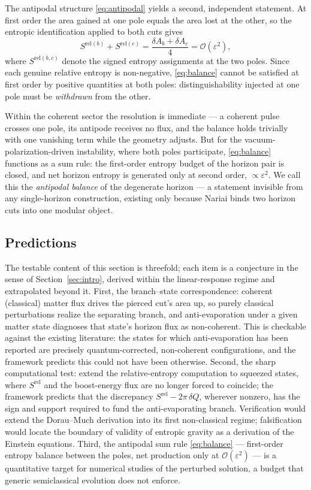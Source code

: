 \documentclass[11pt]{article}
\newcommand{\Srel}{S^{\mathrm{rel}}}
\newcommand{\Nariai}{Nariai}
\begin{document}
The antipodal structure \eqref{eq:antipodal} yields a second, independent statement. At first order the area gained at one pole equals the area lost at the other, so the entropic identification applied to both cuts gives
\begin{equation}
S^{\mathrm{rel}(b)} + S^{\mathrm{rel}(c)}
= \frac{\delta A_b + \delta A_c}{4}
= \mathcal{O}(\varepsilon^2),
\label{eq:balance}
\end{equation}
where $S^{\mathrm{rel}(b,c)}$ denote the signed entropy assignments at the two poles. Since each genuine relative entropy is non-negative, \eqref{eq:balance} cannot be satisfied at first order by positive quantities at both poles: distinguishability injected at one pole must be \emph{withdrawn} from the other.

Within the coherent sector the resolution is immediate --- a coherent pulse crosses one pole, its antipode receives no flux, and the balance holds trivially with one vanishing term while the geometry adjusts. But for the vacuum-polarization-driven instability, where both poles participate, \eqref{eq:balance} functions as a sum rule: the first-order entropy budget of the horizon pair is closed, and net horizon entropy is generated only at second order, $\propto \varepsilon^2$. We call this the \emph{antipodal balance} of the degenerate horizon --- a statement invisible from any single-horizon construction, existing only because \Nariai{} binds two horizon cuts into one modular object.

\subsection{Predictions}

The testable content of this section is threefold; each item is a conjecture in the sense of Section~\ref{sec:intro}, derived within the linear-response regime and extrapolated beyond it. First, the branch--state correspondence: coherent (classical) matter flux drives the pierced cut's area up, so purely classical perturbations realize the separating branch, and anti-evaporation under a given matter state diagnoses that state's horizon flux as non-coherent. This is checkable against the existing literature: the states for which anti-evaporation has been reported are precisely quantum-corrected, non-coherent configurations, and the framework predicts this could not have been otherwise. Second, the sharp computational test: extend the relative-entropy computation to squeezed states, where $\Srel$ and the boost-energy flux are no longer forced to coincide; the framework predicts that the discrepancy $\Srel - 2\pi\,\delta Q$, wherever nonzero, has the sign and support required to fund the anti-evaporating branch. Verification would extend the Dorau--Much derivation into its first non-classical regime; falsification would locate the boundary of validity of entropic gravity as a derivation of the Einstein equations. Third, the antipodal sum rule \eqref{eq:balance} --- first-order entropy balance between the poles, net production only at $\mathcal{O}(\varepsilon^2)$ --- is a quantitative target for numerical studies of the perturbed solution, a budget that generic semiclassical evolution does not enforce.
\end{document}
